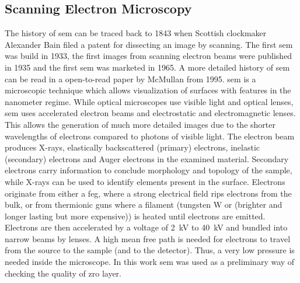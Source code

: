 \subsection{Scanning Electron Microscopy}
The history of \gls{sem} can be traced back to 1843 when Scottish clockmaker Alexander Bain filed a patent for dissecting an image by scanning. 
The first \gls{sem} was build in 1933, 
the first images from scanning electron beams were published in 1935
and the first \gls{sem} was marketed in 1965.
A more detailed history of \gls{sem} can be read in a open-to-read paper by McMullan from 1995\cite{McMullan1995}. 
\Gls{sem} is a microscopic technique which allows visualization of surfaces with features in the nanometer regime. 
While optical microscopes use visible light and optical lenses, \gls{sem} uses accelerated electron beams and electrostatic and electromagnetic lenses.
This allows the generation of much more detailed images due to the shorter wavelengths of electrons compared to photons of visible light\cite{Kaliva2020}.
The electron beam produces X-rays, elastically backscattered (primary) electrons, inelastic (secondary) electrons and Auger electrons in the examined material. 
Secondary electrons carry information to conclude morphology and topology of the sample, while X-rays can be used to identify elements present in the surface. 
Electrons originate from either a \gls{feg}, where a strong electrical field rips electrons from the bulk, or from thermionic guns where a filament (tungsten W or  (brighter and longer lasting but more expensive)) is heated until electrons are emitted. 
Electrons are then accelerated by a voltage of \SI{2}{\kilo\volt} to \SI{40}{\kilo\volt} and bundled into narrow beams by lenses\cite{Vernon2000}.
A high mean free path is needed for electrons to travel from the source to the sample (and to the detector). 
Thus, a very low pressure is needed inside the microscope. 
In this work \gls{sem} was used as a preliminary way of checking the quality of \gls{zro} layer. 
\enlargethispage{\baselineskip}



